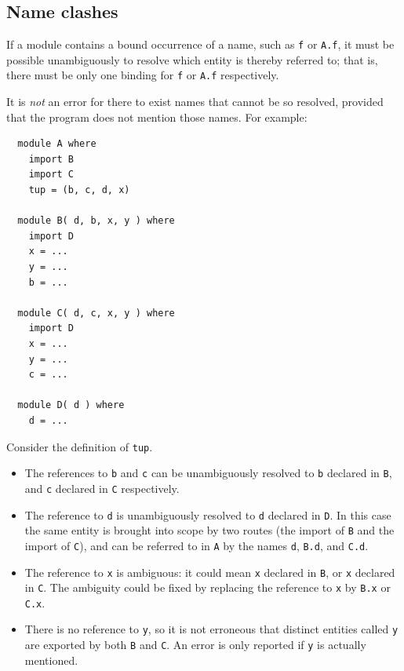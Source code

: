 \subsection{Name clashes}

If a module contains a bound occurrence of a name, such as \mbox{\tt f} or \mbox{\tt A.f},
it must be possible unambiguously to resolve which entity is thereby referred to;
that is, there must be only one binding for \mbox{\tt f} or \mbox{\tt A.f} respectively.

It is {\em not} an error for there to exist names that cannot be so 
resolved, provided that the program does not mention those names.  For example:
\bprog
{\small\begin{verbatim}
  module A where
    import B
    import C
    tup = (b, c, d, x)
  
  module B( d, b, x, y ) where
    import D
    x = ...
    y = ...
    b = ...
  
  module C( d, c, x, y ) where
    import D
    x = ...
    y = ...
    c = ...

  module D( d ) where
    d = ...
\end{verbatim}}
\eprog
Consider the definition of \mbox{\tt tup}.  
\begin{itemize}
\item The references to \mbox{\tt b} and \mbox{\tt c}
can be unambiguously resolved to \mbox{\tt b} declared in \mbox{\tt B}, and \mbox{\tt c} declared in
\mbox{\tt C} respectively.  
\item The reference to \mbox{\tt d} is unambiguously resolved to
\mbox{\tt d} declared in \mbox{\tt D}.  In this case the same entity is brought into scope by two routes
(the import of \mbox{\tt B} and the import of \mbox{\tt C}), and can be referred to in \mbox{\tt A} by the names
\mbox{\tt d}, \mbox{\tt B.d}, and \mbox{\tt C.d}.
\item The reference to \mbox{\tt x} is ambiguous: it could mean \mbox{\tt x} declared in \mbox{\tt B}, or \mbox{\tt x} 
declared in \mbox{\tt C}.  The ambiguity could be fixed by replacing the reference to \mbox{\tt x} by
\mbox{\tt B.x} or \mbox{\tt C.x}.
\item There is no reference to \mbox{\tt y}, so it is not erroneous that distinct entities called
\mbox{\tt y} are exported by both \mbox{\tt B} and \mbox{\tt C}.  An error is only reported if \mbox{\tt y} is actually mentioned.
\end{itemize}

